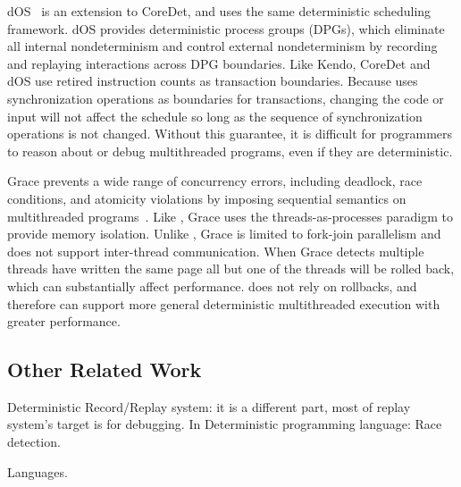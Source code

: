 dOS~\cite{deterministic-process-groups} is an extension to CoreDet, and uses the same deterministic scheduling framework.  dOS provides deterministic process groups (DPGs), which eliminate all internal nondeterminism and control external nondeterminism by recording and replaying interactions across DPG boundaries.  Like Kendo, CoreDet and dOS use retired instruction counts as transaction boundaries.  Because \dthreads{} uses synchronization operations as boundaries for transactions, changing the code or input will not affect the schedule so long as the sequence of synchronization operations is not changed.  Without this guarantee, it is difficult for programmers to reason about or debug multithreaded programs, even if they are deterministic.

Grace prevents a wide range of concurrency errors, including deadlock, race conditions, and atomicity violations by imposing sequential semantics on multithreaded programs~\cite{grace}.  Like \dthreads{}, Grace uses the threads-as-processes paradigm to provide memory isolation.  Unlike \dthreads{}, Grace is limited to fork-join parallelism and does not support inter-thread communication.  When Grace detects multiple threads have written the same page all but one of the threads will be rolled back, which can substantially affect performance.  \dthreads{} does not rely on rollbacks, and therefore can support more general deterministic multithreaded execution with greater performance.

\subsection{Other Related Work}



Deterministic Record/Replay system: it is a different part, most of replay system's target is 
for debugging. In 
Deterministic programming language:
Race detection.

Languages.

